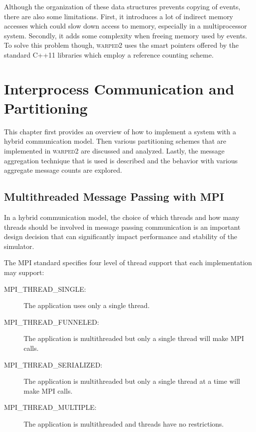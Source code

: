 \documentclass[11pt]{book}
\begin{document}
Although the organization of these data structures prevents copying of events, there are also
some limitations. First, it introduces a lot of indirect memory accesses which could slow down
access to memory, especially in a multiprocessor system. Secondly, it adds some complexity
when freeing memory used by events. To solve this problem though, \textsc{warped2} uses the
smart pointers offered by the standard C++11 libraries which employ a reference counting
scheme.



\chapter{Interprocess Communication and Partitioning} \label{partitioning_communication}

This chapter first provides an overview of how to implement a system with a hybrid communication
model. Then various partitioning schemes that are implemented in \textsc{warped2} are discussed
and analyzed. Lastly, the message aggregation technique that is used is described and the
behavior with various aggregate message counts are explored.

\section{Multithreaded Message Passing with MPI}

In a hybrid communication model, the choice of which threads and how many threads should be
involved in message passing communication is an important design decision that can significantly
impact performance and stability of the simulator.

The MPI standard specifies four level of thread support that each implementation may support:

\begin{description}
    \item[MPI\_THREAD\_SINGLE:] The application uses only a single thread.
    \item[MPI\_THREAD\_FUNNELED:] The application is multithreaded but only a single thread will
        make MPI calls.
    \item[MPI\_THREAD\_SERIALIZED:] The application is multithreaded but only a single thread at
        a time will make MPI calls.
    \item[MPI\_THREAD\_MULTIPLE:] The application is multithreaded and threads have no restrictions.
\end{description}
\end{document}
